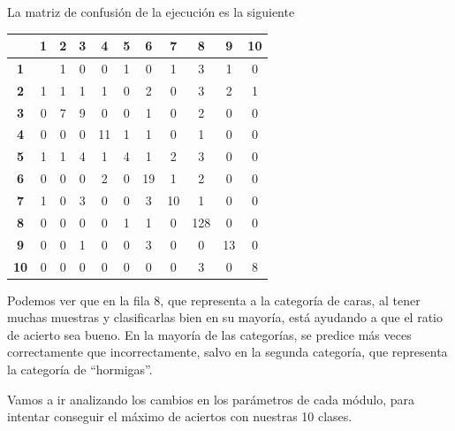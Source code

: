 \documentclass[a4paper,12pt]{article}
\begin{document}
La matriz de confusión de la ejecución es la siguiente
\begin{table}[h]
\centering
\begin{tabular}{c|c|c|c|c|c|c|c|c|c|c|}
\cline{2-11}
 & \textbf{1} & \textbf{2} & \textbf{3} & \textbf{4} & \textbf{5} & \textbf{6} & \textbf{7} & \textbf{8} & \textbf{9} & \textbf{10} \\ \hline
\multicolumn{1}{|c|}{\textbf{1}} & \cellcolor[HTML]{dddddd}{\color[HTML]{343434} 3} & 1 & 0 & 0 & 1 & 0 & 1 & 3 & 1 & 0 \\ \hline
\multicolumn{1}{|c|}{\textbf{2}} & 1 & \cellcolor[HTML]{dddddd}1 & 1 & 1 & 0 & 2 & 0 & 3 & 2 & 1 \\ \hline
\multicolumn{1}{|c|}{\textbf{3}} & 0 & 7 & \cellcolor[HTML]{dddddd}9 & 0 & 0 & 1 & 0 & 2 & 0 & 0 \\ \hline
\multicolumn{1}{|c|}{\textbf{4}} & 0 & 0 & 0 & \cellcolor[HTML]{dddddd}11 & 1 & 1 & 0 & 1 & 0 & 0 \\ \hline
\multicolumn{1}{|c|}{\textbf{5}} & 1 & 1 & 4 & 1 & \cellcolor[HTML]{dddddd}4 & 1 & 2 & 3 & 0 & 0 \\ \hline
\multicolumn{1}{|c|}{\textbf{6}} & 0 & 0 & 0 & 2 & 0 & \cellcolor[HTML]{dddddd}19 & 1 & 2 & 0 & 0 \\ \hline
\multicolumn{1}{|c|}{\textbf{7}} & 1 & 0 & 3 & 0 & 0 & 3 & \cellcolor[HTML]{dddddd}10 & 1 & 0 & 0 \\ \hline
\multicolumn{1}{|c|}{\textbf{8}} & 0 & 0 & 0 & 0 & 1 & 1 & 0 & \cellcolor[HTML]{dddddd}128 & 0 & 0 \\ \hline
\multicolumn{1}{|c|}{\textbf{9}} & 0 & 0 & 1 & 0 & 0 & 3 & 0 & 0 & \cellcolor[HTML]{dddddd}13 & 0 \\ \hline
\multicolumn{1}{|c|}{\textbf{10}} & 0 & 0 & 0 & 0 & 0 & 0 & 0 & 3 & 0 & \cellcolor[HTML]{dddddd}8 \\ \hline
\end{tabular}
\end{table}

Podemos ver que en la fila 8, que representa a la categoría de caras, al tener 
muchas muestras y clasificarlas bien en su mayoría, está ayudando a que el ratio
de acierto sea bueno. En la mayoría de las categorías, se predice más veces 
correctamente que incorrectamente, salvo en la segunda categoría, que representa
la categoría de ``hormigas''.

Vamos a ir analizando los cambios en los parámetros de cada módulo, para 
intentar conseguir el máximo de aciertos con nuestras 10 clases.
\end{document}
